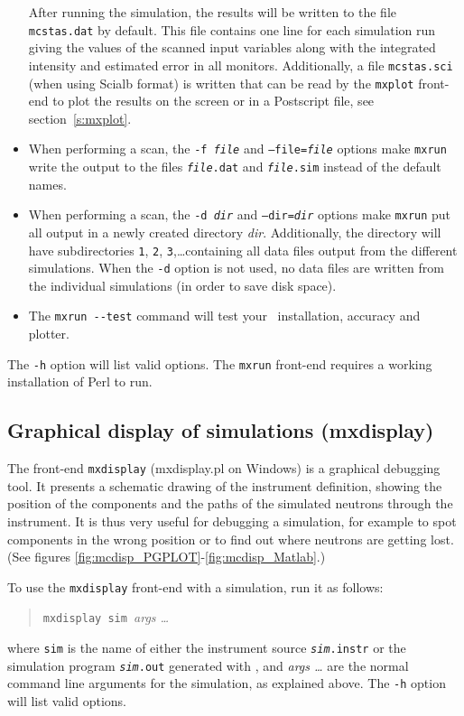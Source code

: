 \begin{itemize}
After running the simulation, the results will be written to the file
\verb+mcstas.dat+ by default. This file contains one line for each
simulation run giving the values of the scanned input variables along
with the integrated intensity and estimated error in all monitors. Additionally, a
file \verb+mcstas.sci+ (when using Scialb format) is written that can be read by the \verb+mxplot+
front-end to plot the results on the screen or in a Postscript file, see
section~\ref{s:mxplot}. 
\item When performing a scan, the \texttt{-f {\it file}} and
  \texttt{--file={\it file}} options make \verb+mxrun+ write the output
  to the files \texttt{{\it file\/}.dat} and \texttt{{\it file\/}.sim}
  instead of the default names.
\item When performing a scan, the \texttt{-d {\it dir}} and
  \texttt{--dir={\it dir}} options make \verb+mxrun+ put all output in a
  newly created directory \textit{dir}. Additionally, the directory will
  have subdirectories \verb+1+, \verb+2+, \verb+3+,\ldots containing all
  data files output from the different simulations. When the \verb+-d+
  option is not used, no data files are written from the individual
  simulations (in order to save disk space).
\item The \verb+mxrun --test+ command will test your \MCX\ installation, accuracy and plotter. 
\end{itemize}

The \verb+-h+ option will list valid options. The \verb+mxrun+ front-end requires a working installation of Perl to run.


\subsection{Graphical display of simulations (mxdisplay)}
\label{s:mxdisplay}

The front-end \verb+mxdisplay+ (mxdisplay.pl on Windows) is a graphical debugging tool.
It presents a schematic drawing of the instrument
definition, showing the position of the components and the paths of the
simulated neutrons through the instrument. It is thus very useful for
debugging a simulation, for example to spot components in the wrong
position or to find out where neutrons are getting lost.
(See figures \ref{fig:mcdisp_PGPLOT}-\ref{fig:mcdisp_Matlab}.)

To use the \verb+mxdisplay+ front-end with a simulation, run it as
follows:
\begin{quote}
  \verb+mxdisplay sim +{\it args \ldots}
\end{quote}
where \verb+sim+ is the name of either the instrument source \texttt{{\it sim}.instr} or the simulation program \texttt{{\it sim}.out} generated with
\MCX, and \textit{args \ldots} are the normal command line arguments for
the simulation, as explained above. The \verb+-h+ option will list valid options.

